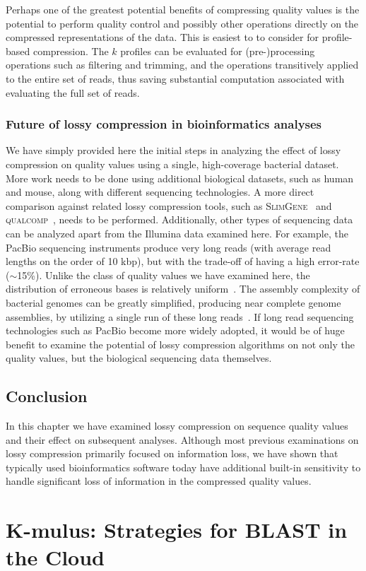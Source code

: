 \documentclass[12pt,\mydriver]{thesis}
\begin{document}
Perhaps one of the greatest potential benefits of compressing quality
values is the potential to perform quality control and possibly other
operations directly on the compressed representations of the
data. This is easiest to to consider for profile-based
compression. The $k$ profiles can be evaluated for (pre-)processing
operations such as filtering and trimming, and the operations
transitively applied to the entire set of reads, thus saving
substantial computation associated with evaluating the full set of
reads.

\subsubsection{Future of lossy compression in bioinformatics analyses}

We have simply provided here the initial steps in analyzing the effect
of lossy compression on quality values using a single,
high-coverage bacterial dataset. More work needs to be done using
additional biological datasets, such as human and mouse, along with
different sequencing technologies. A more direct comparison against
related lossy compression tools, such as
\textsc{SlimGene}~\cite{Kozanitis:2011kl} and
\textsc{\textsc{q}ual\textsc{c}omp}~\cite{Ochoa:2013rt}, needs to be
performed. Additionally, other types of sequencing data can be
analyzed apart from the Illumina data examined here. For example, the
PacBio sequencing instruments produce very long reads (with average
read lengths on the order of 10 kbp), but with the trade-off of having
a high error-rate ($\sim$15\%). Unlike the class of quality values we
have examined here, the distribution of erroneous bases is relatively
uniform~\cite{Ferrarini:2013vf}. The assembly complexity of bacterial
genomes can be greatly simplified, producing near complete genome
assemblies, by utilizing a single run of these long
reads~\cite{Koren:2013ye}. If long read sequencing technologies such
as PacBio become more widely adopted, it would be of huge benefit to
examine the potential of lossy compression algorithms on not only the
quality values, but the biological sequencing data themselves.



\subsection{Conclusion}

In this chapter we have examined lossy compression on sequence quality
values and their effect on subsequent analyses. Although most previous
examinations on lossy compression primarily focused on information
loss, we have shown that typically used bioinformatics software today
have additional built-in sensitivity to handle significant loss of
information in the compressed quality values.
\clearpage{}
\clearpage{}\section{K-mulus: Strategies for BLAST in the Cloud}
\label{kmulus-section}
\end{document}
